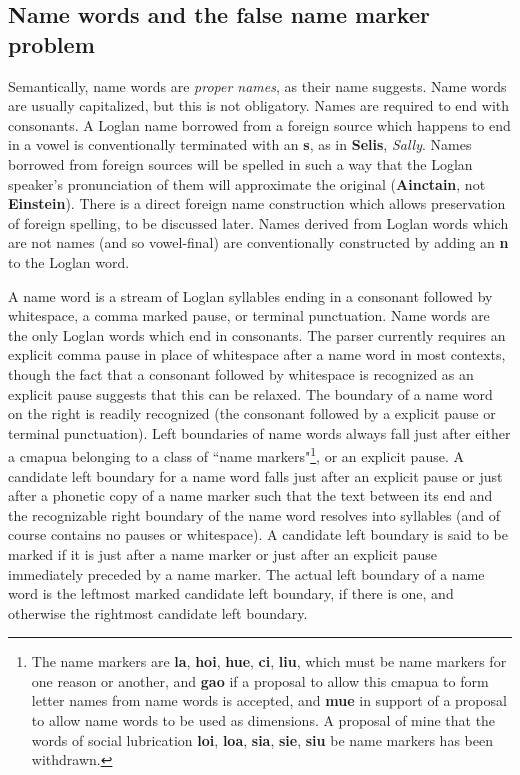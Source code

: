\documentclass[12pt]{book}
\begin{document}
\subsection{Name words and the false name marker problem}

Semantically, name words are {\em proper names\/}, as their name suggests.  Name words are usually capitalized, but this is not obligatory.  Names are required to end with consonants.  A Loglan name borrowed from a foreign source which happens to end in a vowel is conventionally terminated with an {\bf s},
as in {\bf Selis}, {\em Sally\/}.  Names borrowed from foreign sources will be spelled in such a way that the Loglan speaker's pronunciation of them will approximate the original ({\bf Ainctain}, not {\bf Einstein}).  There is a direct foreign name construction which allows preservation of foreign spelling, to be discussed later.  Names derived from Loglan words which are not names (and so vowel-final) are conventionally constructed by adding an {\bf n} to
the Loglan word.

A name word is a stream of Loglan syllables ending in a consonant followed by whitespace, a comma marked pause, or terminal punctuation.  Name words are the only Loglan words which end in consonants.  The parser currently requires an explicit comma pause in place of whitespace after a name word in most contexts, though the fact that a consonant followed by whitespace is recognized as an explicit pause suggests that this can be relaxed.  The boundary of a name word on the right is readily recognized (the consonant followed by a explicit pause or terminal punctuation).  Left boundaries of name words always fall just after either a cmapua belonging to a class of ``name markers"\footnote{The name markers are {\bf la}, {\bf hoi}, {\bf hue}, {\bf ci}, {\bf liu}, which must be name markers for one reason or another, and {\bf gao} if a proposal to allow this cmapua to form letter names from name words is accepted, and {\bf mue} in support of a proposal to allow name words to be used as dimensions.  A proposal of mine that the words of social lubrication {\bf loi}, {\bf loa}, {\bf sia}, {\bf sie}, {\bf siu} be name markers has been withdrawn.}, or an explicit pause.   A candidate left boundary for a name word falls just after an explicit pause or just after a phonetic copy of a name marker such that the text between its end and the recognizable right boundary of the name word resolves into syllables (and of course contains no pauses or whitespace).   A candidate left boundary is said to be marked if it is just after a name marker  or just after an explicit pause immediately preceded by a name marker.  The actual left boundary of a name word is the leftmost marked candidate left boundary, if there is one, and otherwise the rightmost candidate left boundary.
\end{document}
